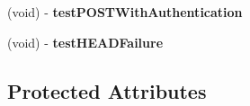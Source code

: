 \begin{DoxyCompactItemize}
\item 
\hypertarget{interface_a_s_i_network_queue_tests_aa73ecf9606cf1826f4137aef4ff343be}{
(void) -\/ {\bfseries test\-P\-O\-S\-T\-With\-Authentication}}
\label{interface_a_s_i_network_queue_tests_aa73ecf9606cf1826f4137aef4ff343be}

\item 
\hypertarget{interface_a_s_i_network_queue_tests_aa50e545358ffc84eea2a4f61e6d782eb}{
(void) -\/ {\bfseries test\-H\-E\-A\-D\-Failure}}
\label{interface_a_s_i_network_queue_tests_aa50e545358ffc84eea2a4f61e6d782eb}

\end{DoxyCompactItemize}
\subsection*{\-Protected \-Attributes}
